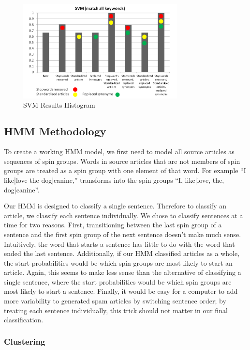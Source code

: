 \documentclass[11pt,letterpaper,oneside, titlepage]{scrartcl}
\begin{document}
\begin{figure}[h!]
  \centering
  \includegraphics[width=0.75\textwidth]{svm_allmatches}
  \caption{SVM Results Histogram}
  \label{fig:svm}
\end{figure}

\clearpage

\subsection{HMM Methodology}

To create a working HMM model, we first need to model all source articles as sequences of spin groups. Words in source articles that are not members of spin groups are treated as a spin group with one element of that word. For example “I {like|love} the {dog|canine},” transforms into the spin groups “{I}, {like|love}, {the}, {dog|canine}”.

Our HMM is designed to classify a single sentence. Therefore to classify an article, we classify each sentence individually. We chose to classify sentences at a time for two reasons. First, transitioning between the last spin group of a sentence and the first spin group of the next sentence doesn’t make much sense. Intuitively, the word that starts a sentence has little to do with the word that ended the last sentence. Additionally, if our HMM classified articles as a whole, the start probabilities would be which spin groups are most likely to start an article. Again, this seems to make less sense than the alternative of classifying a single sentence, where the start probabilities would be which spin groups are most likely to start a sentence. Finally, it would be easy for a computer to add more variability to generated spam articles by switching sentence order; by treating each sentence individually, this trick should not matter in our final classification.

\subsubsection{Clustering}
\end{document}
